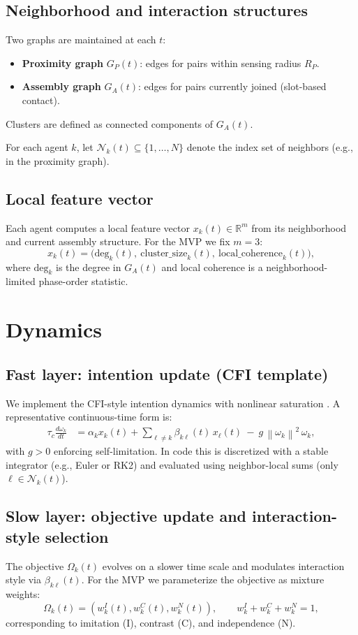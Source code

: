 \documentclass[11pt]{article}
\newcommand{\Neigh}{\mathcal{N}} %
\newcommand{\R}{\mathbb{R}}
\newcommand{\norm}[1]{\left\lVert #1 \right\rVert}
\begin{document}
\subsection{Neighborhood and interaction structures}
Two graphs are maintained at each $t$:
\begin{itemize}[leftmargin=2.2em]
\item \textbf{Proximity graph} $G_P(t)$: edges for pairs within sensing radius $R_P$.
\item \textbf{Assembly graph} $G_A(t)$: edges for pairs currently joined (slot-based contact).
\end{itemize}
Clusters are defined as connected components of $G_A(t)$.

For each agent $k$, let $\Neigh_k(t)\subseteq\{1,\dots,N\}$ denote the index set of neighbors (e.g., in the proximity graph).

\subsection{Local feature vector}
Each agent computes a local feature vector $x_k(t)\in\R^m$ from its neighborhood and current assembly structure.
For the MVP we fix $m=3$:
\[
x_k(t)=\bigl(\text{deg}_k(t),\ \text{cluster\_size}_k(t),\ \text{local\_coherence}_k(t)\bigr),
\]
where $\text{deg}_k$ is the degree in $G_A(t)$ and local coherence is a neighborhood-limited phase-order statistic.

\section{Dynamics}
\subsection{Fast layer: intention update (CFI template)}
We implement the CFI-style intention dynamics with nonlinear saturation \cite{canonne_garnier_mcm2011}.
A representative continuous-time form is:
\begin{align}
\tau_c \frac{d\omega_k}{dt}
  &= \alpha_k x_k(t) + \sum_{\ell\ne k} \beta_{k\ell}(t)\,x_\ell(t)\ -\ g\,\norm{\omega_k}^2\,\omega_k,
\label{eq:intention}
\end{align}
with $g>0$ enforcing self-limitation. In code this is discretized with a stable integrator (e.g., Euler or RK2)
and evaluated using neighbor-local sums (only $\ell\in \Neigh_k(t)$).

\subsection{Slow layer: objective update and interaction-style selection}
The objective $\Omega_k(t)$ evolves on a slower time scale and modulates interaction style via $\beta_{k\ell}(t)$.
For the MVP we parameterize the objective as mixture weights:
\[
\Omega_k(t) = (w^I_k(t), w^C_k(t), w^N_k(t)),\qquad w^I_k+w^C_k+w^N_k=1,
\]
corresponding to imitation (I), contrast (C), and independence (N).
\end{document}
